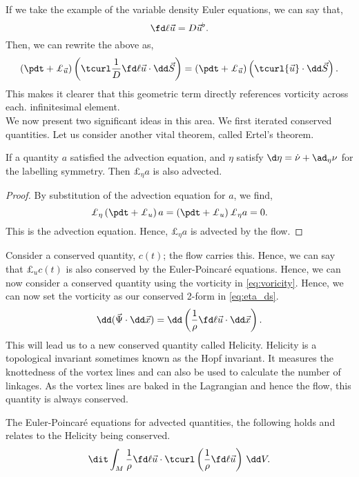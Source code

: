 \noindent
If we take the example of the variable density Euler equations, we can say that,
$$ \fd \ell {\vec u} = D\vec u^\flat. $$
Then, we can rewrite the above as,
$$ \left( \pdt + \pounds_{\vec u} \right) \left( \tcurl \frac{1}{D}\fd \ell {\vec u} \cdot \dd \vec S \right) = \left( \pdt + \pounds_{\vec u} \right) \left( \tcurl {\vec u} \cdot \dd \vec S \right). $$
This makes it clearer that this geometric term directly references vorticity across each. infinitesimal element.\\

\noindent
We now present two significant ideas in this area. We first iterated conserved quantities. Let us consider another vital theorem, called Ertel's theorem.
\begin{nthm}
  If a quantity $a$ satisfied the advection equation, and $\eta$ satisfy $\d\eta = \dot \nu + \ad_{\eta}\nu$ for the labelling symmetry. Then $\pounds_\eta a$ is also advected.
\end{nthm}
\begin{proof}
  By substitution of the advection equation for $a$, we find,
  $$ \pounds_\eta \left(\pdt + \pounds_u \right)a = \left(\pdt + \pounds_u\right)\pounds_\eta a = 0. $$
  This is the advection equation. Hence, $\pounds_\eta a$ is advected by the flow.
\end{proof}
\noindent
Consider a conserved quantity, $c(t)$; the flow carries this. Hence, we can say that $\pounds_u c(t)$ is also conserved by the Euler-Poincar\'e equations. Hence, we can now consider a conserved quantity using the vorticity in \eqref{eq:voricity}. Hence, we can now set the vorticity as our conserved 2-form in \eqref{eq:eta_ds}.
$$ \dd (\vec\Psi \cdot \dd \vec x) = \dd \left( \frac{1}{\rho}\fd \ell {\vec u} \cdot \dd \vec x \right). $$
This will lead us to a new conserved quantity called Helicity. Helicity is a topological invariant sometimes known as the Hopf invariant. It measures the knottedness of the vortex lines and can also be used to calculate the number of linkages. As the vortex lines are baked in the Lagrangian and hence the flow, this quantity is always conserved.
\begin{nlemma}
  The Euler-Poincar\'e equations for advected quantities, the following holds and relates to the Helicity being conserved.
  $$ \dit\int_M \frac{1}{\rho} \fd \ell {\vec u} \cdot \tcurl\left( \frac{1}{\rho} \fd \ell {\vec u} \right) \,\dd V. $$
\end{nlemma}
